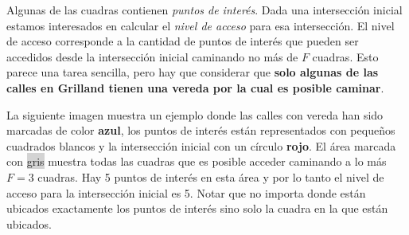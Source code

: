 \documentclass{oci}
\begin{document}
\begin{problemDescription}
  Algunas de las cuadras contienen \emph{puntos de interés}.
  Dada una intersección inicial estamos interesados en calcular el \emph{nivel de acceso} para
  esa intersección.
  El nivel de acceso corresponde a la cantidad de puntos de interés que pueden ser accedidos
  desde la intersección inicial caminando no más de $F$ cuadras.
  Esto parece una tarea sencilla, pero hay que considerar que {\bf solo algunas de las calles en Grilland
  tienen una vereda por la cual es posible caminar}.

  La siguiente imagen muestra un ejemplo donde las calles con vereda han sido marcadas de color
  {\bf\color{blue}azul}, los puntos de interés están representados con pequeños cuadrados blancos
  y la intersección inicial con un círculo {\bf\color{red}rojo}.
  El área marcada con \colorbox{lightgray}{gris} muestra todas las cuadras que es posible acceder
  caminando a lo más $F=3$ cuadras.
  Hay 5 puntos de interés en esta área y por lo tanto el nivel de acceso para la intersección
  inicial es 5.
  Notar que no importa donde están ubicados exactamente los puntos de interés sino solo la cuadra
  en la que están ubicados.

  \begin{center}
\end{center}
\end{problemDescription}
\end{document}
